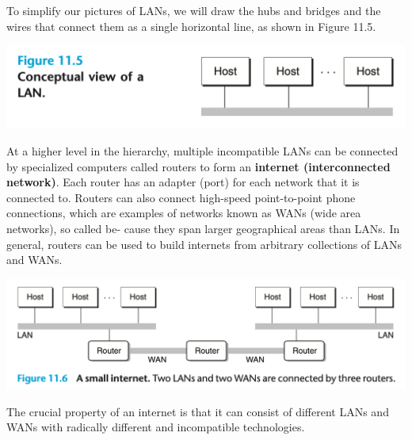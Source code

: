 \documentclass[11pt]{article}
\begin{document}
To simplify our pictures of LANs, we will draw the hubs and bridges and the wires that connect them as a single horizontal line, as shown in Figure 11.5.\\

\begin{center}
\includegraphics[width=.9\linewidth]{pics/figure11.5-conceptual-view-of-a-lan.png}
\end{center}


At a higher level in the hierarchy, multiple incompatible LANs can be connected by specialized computers called routers to form an \textbf{internet (interconnected network)}. Each router has an adapter (port) for each network that it is connected to. Routers can also connect high-speed point-to-point phone connections, which are examples of networks known as WANs (wide area networks), so called be- cause they span larger geographical areas than LANs. In general, routers can be used to build internets from arbitrary collections of LANs and WANs.\\

\begin{center}
\includegraphics[width=.9\linewidth]{pics/figure11.6-a-small-internet.png}
\end{center}

The crucial property of an internet is that it can consist of different LANs and WANs with radically different and incompatible technologies.\\
\end{document}
